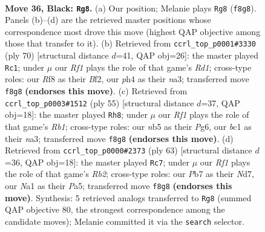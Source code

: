 \documentclass[11pt]{article}
\begin{document}
\clearpage

\begin{figure}[p]\centering
\begin{subfigure}{0.46\textwidth}\centering
\resizebox{\linewidth}{!}{%
\newchessgame
\chessboard[
  setfen={5r2/1p1kp2p/n5p1/pNp5/5P1P/2P5/P4PK1/n1B4R b - - 1 36},
  showmover=false,
  pgfstyle=straightmove, color=movearrow, markmove={f8-g8}
]}
\caption{}
\end{subfigure}\hfill
\begin{subfigure}{0.46\textwidth}\centering
\resizebox{\linewidth}{!}{%
\newchessgame
\chessboard[
  setfen={2r3k1/p4ppp/8/3pPP2/6P1/nPp5/P4BKP/3R4 w - - 0 36},
  showmover=false,
  pgfstyle=straightmove, color=movearrow, markmove={d1-c1}
]}
\caption{}
\end{subfigure}
\\[4pt]
\begin{subfigure}{0.46\textwidth}\centering
\resizebox{\linewidth}{!}{%
\newchessgame
\chessboard[
  setfen={1r6/2p2p1p/6p1/RPnk2P1/4p3/N3P3/5PKP/8 b - - 2 28},
  showmover=false,
  pgfstyle=straightmove, color=movearrow, markmove={b8-h8}
]}
\caption{}
\end{subfigure}\hfill
\begin{subfigure}{0.46\textwidth}\centering
\resizebox{\linewidth}{!}{%
\newchessgame
\chessboard[
  setfen={8/1r1nkpp1/7p/p2Pp3/P1B3PP/2R5/1PP5/2K5 b - - 0 32},
  showmover=false,
  pgfstyle=straightmove, color=movearrow, markmove={b7-c7}
]}
\caption{}
\end{subfigure}
\caption{\textbf{Move 36, Black: \texttt{Rg8}.} (a) Our position; Melanie plays \texttt{Rg8} (\texttt{f8g8}). Panels (b)--(d) are the retrieved master positions whose correspondence most drove this move (highest QAP objective among those that transfer to it). (b) Retrieved from \texttt{ccrl\_top\_p0001\#3330} (ply 70) [structural distance $d$=41, QAP obj=26]: the master played \texttt{Rc1}; under $\mu$ our \emph{Rf1} plays the role of that game's \emph{Rd1}; cross-type roles: our \emph{R}f8 as their \emph{B}f2, our \emph{p}h4 as their \emph{n}a3; transferred move \texttt{f8g8} \textbf{(endorses this move)}. (c) Retrieved from \texttt{ccrl\_top\_p0003\#1512} (ply 55) [structural distance $d$=37, QAP obj=18]: the master played \texttt{Rh8}; under $\mu$ our \emph{Rf1} plays the role of that game's \emph{Rb1}; cross-type roles: our \emph{n}b5 as their \emph{P}g6, our \emph{b}c1 as their \emph{n}a3; transferred move \texttt{f8g8} \textbf{(endorses this move)}. (d) Retrieved from \texttt{ccrl\_top\_p0000\#2373} (ply 63) [structural distance $d$=36, QAP obj=18]: the master played \texttt{Rc7}; under $\mu$ our \emph{Rf1} plays the role of that game's \emph{Rb2}; cross-type roles: our \emph{P}b7 as their \emph{N}d7, our \emph{N}a1 as their \emph{P}a5; transferred move \texttt{f8g8} \textbf{(endorses this move)}. Synthesis: 5 retrieved analogs transferred to \texttt{Rg8} (summed QAP objective 80, the strongest correspondence among the candidate moves); Melanie committed it via the \texttt{search} selector.}
\label{fig:thought-m71}
\end{figure}
\end{document}
